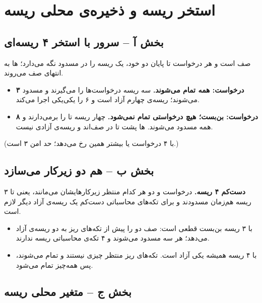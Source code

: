 \section{استخر ریسه و ذخیره‌ی محلی ریسه}

\subsection*{بخش آ – سرور با استخر ۴ ریسه‌ای}

صف  است و هر درخواست تا پایان دو  خود، یک ریسه را در  مسدود نگه می‌دارد؛ ها به انتهای صف می‌روند.
\begin{itemize}
  \item \textbf{۳ درخواست: همه تمام می‌شوند.} سه ریسه درخواست‌ها را می‌گیرند و مسدود می‌شوند؛ ریسه‌ی چهارم آزاد است و ۶  را یکی‌یکی اجرا می‌کند.
  \item \textbf{۸ درخواست: بن‌بست؛ هیچ درخواستی تمام نمی‌شود.} چهار ریسه  تا  را برمی‌دارند و همه مسدود می‌شوند. ها پشت  تا  در صف‌اند و ریسه‌ی آزادی نیست.
\end{itemize}
(با ۴ درخواست یا بیشتر همین رخ می‌دهد؛ حد امن ۳ است.)

\subsection*{بخش ب –  هم دو زیرکار می‌سازد}

\textbf{دست‌کم ۴ ریسه.} درخواست و دو  هر کدام منتظر زیرکارهایشان می‌مانند، یعنی تا ۳ ریسه هم‌زمان مسدودند و برای تکه‌های محاسباتی دست‌کم یک ریسه‌ی آزاد دیگر لازم است.
\begin{itemize}
  \item با ۳ ریسه بن‌بست قطعی است: صف  دو  را پیش از تکه‌های ریز به دو ریسه‌ی آزاد می‌دهد؛ هر سه مسدود می‌شوند و ۴ تکه‌ی محاسباتی ریسه ندارند.
  \item با ۴ ریسه همیشه یکی آزاد است. تکه‌های ریز منتظر چیزی نیستند و تمام می‌شوند، پس همه‌چیز تمام می‌شود.
\end{itemize}

\subsection*{بخش ج – متغیر محلی ریسه}

